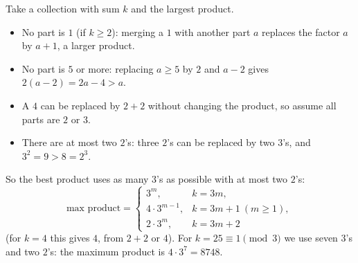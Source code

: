 Take a collection with sum $k$ and the largest product.
\begin{itemize}
\item No part is $1$ (if $k\ge2$): merging a $1$ with another part $a$ replaces the factor $a$ by $a+1$, a larger product.
\item No part is $5$ or more: replacing $a\ge5$ by $2$ and $a-2$ gives $2(a-2)=2a-4>a$.
\item A $4$ can be replaced by $2+2$ without changing the product, so assume all parts are $2$ or $3$.
\item There are at most two $2$'s: three $2$'s can be replaced by two $3$'s, and $3^2=9>8=2^3$.
\end{itemize}
So the best product uses as many $3$'s as possible with at most two $2$'s:
\[
\text{max product}=\begin{cases}3^{m}, & k=3m,\\ 4\cdot3^{m-1}, & k=3m+1\ (m\ge1),\\ 2\cdot3^{m}, & k=3m+2\end{cases}
\]
(for $k=4$ this gives $4$, from $2+2$ or $4$). For $k=25\equiv1\pmod3$ we use seven $3$'s and two $2$'s: the maximum product is $4\cdot3^7=\boxed{8748}$.
